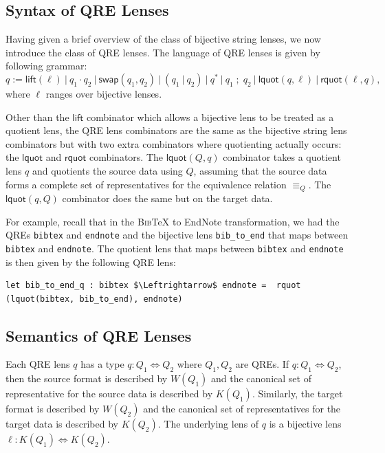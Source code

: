 \documentclass[acmsmall,review,anonymous]{acmart}
\newcommand{\codefont}[1]{\ensuremath{\mathsf{#1}}}
\newcommand{\kw}[1]{\codefont{#1}}
\newcommand{\eqrel}[1]{\ensuremath{\equiv_{#1}}}
\newcommand{\sep}{\ensuremath{\ | \ }}
\newcommand{\bibtex}{\textsc{Bib}\TeX{}}
\newcommand{\swap}{\ensuremath{\kw{swap}}}
\newcommand{\lquot}{\ensuremath{\kw{lquot}}}
\newcommand{\rquot}{\ensuremath{\kw{rquot}}}
\newcommand{\lift}{\ensuremath{\kw{lift}}}
\newcommand{\cd}[1]{\lstinline[backgroundcolor=\color{white}]$#1$}
\begin{document}
\subsection{Syntax of QRE Lenses}
\label{subsec:qre-lenses-syntax}
Having given a brief overview of the class of bijective string lenses, we now
introduce the class of QRE lenses. The language of QRE lenses is given by following
grammar:
$$ q := \lift(\ell) \sep  q_1 \cdot q_2 \sep \swap(q_1, q_2) \sep (q_1 \sep q_2)
\sep q^* \sep q_1 \; ; \; q_2 \sep \lquot(q, \ell) \sep \rquot(\ell, q),$$ where
$\ell$ ranges over bijective lenses.

Other than the \kw{lift} combinator which allows a bijective lens to be
treated as a quotient lens, the QRE lens combinators are the same as the
bijective string lens combinators but with two extra combinators where
quotienting actually occurs: the $\lquot$ and $\rquot$ combinators. The
$\lquot(Q, q)$ combinator takes a quotient lens $q$ and quotients the source
data using $Q$, assuming that the source data forms a complete set of
representatives for the equivalence relation $\eqrel{Q}$. The $\lquot(q, Q)$
combinator does the same but on the target data.

For example, recall that in the \bibtex{} to EndNote transformation, we had the
QREs \cd{bibtex} and \cd{endnote} and the bijective lens \cd{bib_to_end}
that maps between 
\cd{bibtex} and \cd{endnote}. The quotient lens that maps between
\cd{bibtex} and \cd{endnote} is then given by the following QRE lens:

\begin{lstlisting}
let bib_to_end_q : bibtex $\Leftrightarrow$ endnote =  rquot (lquot(bibtex, bib_to_end), endnote)
\end{lstlisting}

\subsection{Semantics of QRE Lenses}
\label{subsec:qre-lenses-semantics}
Each QRE lens $q$ has a type $q : Q_1 \Leftrightarrow Q_2$ where $Q_1, Q_2$ are
QREs. If $q : Q_1 \Leftrightarrow Q_2$, then the source format is described by
$W(Q_1)$ and the canonical set of representative for the source data is
described by $K(Q_1)$.
Similarly, the target format is described by $W(Q_2)$ and the canonical set of
representatives for the target data is described by $K(Q_2)$. The underlying
lens of $q$ is a bijective lens $\ell : K(Q_1) \Leftrightarrow K(Q_2)$.
\end{document}
